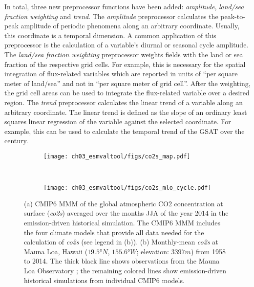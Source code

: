 In total, three new preprocessor functions have been added: \emph{amplitude},
\emph{land/sea fraction weighting} and \emph{trend}. The \emph{amplitude}
preprocessor calculates the peak-to-peak amplitude of periodic phenomena along
an arbitrary coordinate. Usually, this coordinate is a temporal dimension. A
common application of this preprocessor is the calculation of a variable's
diurnal or seasonal cycle amplitude. The \emph{land/sea fraction weighting}
preprocessor weights fields with the land or sea fraction of the respective
grid cells. For example, this is necessary for the spatial integration of
flux-related variables which are reported in units of \enquote{per square meter
  of land/sea} and not in \enquote{per square meter of grid cell}. After the
weighting, the grid cell areas can be used to integrate the flux-related
variable over a desired region. The \emph{trend} preprocessor calculates the
linear trend of a variable along an arbitrary coordinate. The linear trend is
defined as the slope of an ordinary least squares linear regression of the
variable against the selected coordinate. For example, this can be used to
calculate the temporal trend of the \ac{GSAT} over the  century.

\begin{figure}[t]
  \centering
  \begin{subfigure}[t]{\SubfigureWidth{}}
    \texttt{[image: ch03\_esmvaltool/figs/co2s\_map.pdf]}
    \caption{}
    \label{fig:03:co2s:a}
  \end{subfigure}
  ~
  \begin{subfigure}[t]{\SubfigureWidth{}}
    \texttt{[image: 
      ch03\_esmvaltool/figs/co2s\_mlo\_cycle.pdf]}
    \caption{}
    \label{fig:03:co2s:b}
  \end{subfigure}
  \caption{(a) \acs{CMIP}6 \acf{MMM} of the global atmospheric \acs{CO2}
    concentration at surface (\emph{co2s}) averaged over the months \acf{JJA}
    of the year 2014 in the emission-driven historical simulation. The
    \acs{CMIP}6 \ac{MMM} includes the four climate models that provide all
    data needed for the calculation of \emph{co2s} (see legend in (b)). (b)
    Monthly-mean \emph{co2s} at Mauna Loa, Hawaii ($19.5 \unit{\degree N}$,
    $155.6 \unit{\degree W}$; elevation: $3397 \unit{m}$) from 1958 to 2014.
    The thick black line shows observations from the Mauna Loa Observatory
    \autocite{Keeling2005}; the remaining colored lines show emission-driven
    historical simulations from individual \acs{CMIP}6 models.}
  \label{fig:03:co2s}
\end{figure}

